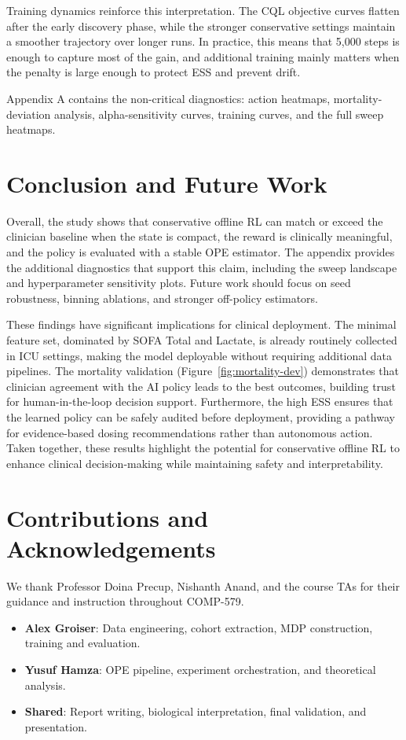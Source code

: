 \documentclass[11pt]{article}
\begin{document}
Training dynamics reinforce this interpretation. The CQL objective curves flatten after the early discovery phase, while the stronger conservative settings maintain a smoother trajectory over longer runs. In practice, this means that 5,000 steps is enough to capture most of the gain, and additional training mainly matters when the penalty is large enough to protect ESS and prevent drift.

Appendix A contains the non-critical diagnostics: action heatmaps, mortality-deviation analysis, alpha-sensitivity curves, training curves, and the full sweep heatmaps.

\newpage

\section{Conclusion and Future Work}
Overall, the study shows that conservative offline RL can match or exceed the clinician baseline when the state is compact, the reward is clinically meaningful, and the policy is evaluated with a stable OPE estimator. The appendix provides the additional diagnostics that support this claim, including the sweep landscape and hyperparameter sensitivity plots. Future work should focus on seed robustness, binning ablations, and stronger off-policy estimators.

These findings have significant implications for clinical deployment. The minimal feature set, dominated by SOFA Total and Lactate, is already routinely collected in ICU settings, making the model deployable without requiring additional data pipelines. The mortality validation (Figure~\ref{fig:mortality-dev}) demonstrates that clinician agreement with the AI policy leads to the best outcomes, building trust for human-in-the-loop decision support. Furthermore, the high ESS ensures that the learned policy can be safely audited before deployment, providing a pathway for evidence-based dosing recommendations rather than autonomous action. Taken together, these results highlight the potential for conservative offline RL to enhance clinical decision-making while maintaining safety and interpretability.

\section{Contributions and Acknowledgements}
We thank Professor Doina Precup, Nishanth Anand, and the course TAs for their guidance and instruction throughout COMP-579. 
\begin{itemize}[leftmargin=*]
  \item \textbf{Alex Groiser}: Data engineering, cohort extraction, MDP construction, training and evaluation.
  \item \textbf{Yusuf Hamza}: OPE pipeline, experiment orchestration, and theoretical analysis.
  \item \textbf{Shared}: Report writing, biological interpretation, final validation, and presentation.
\end{itemize}
\end{document}
